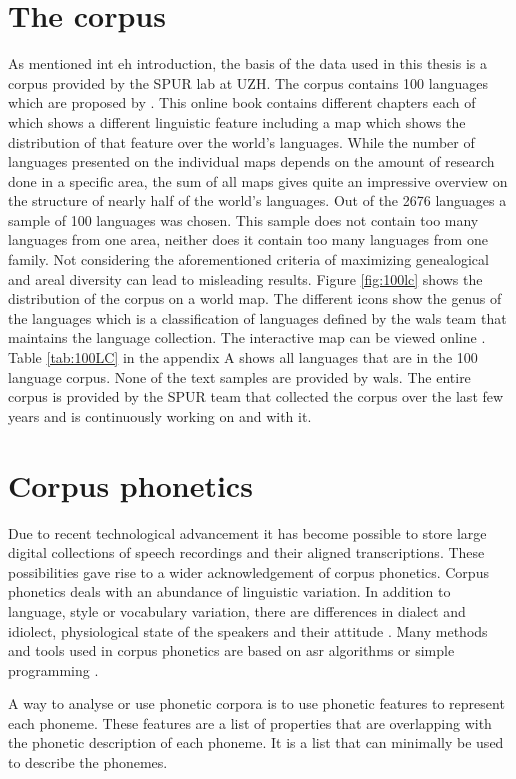 \section{The corpus}
\label{corpus}
As mentioned int eh introduction, the basis of the data used in this thesis is a corpus provided by the SPUR lab at UZH. The corpus contains 100 languages which are proposed by \citet{Comrie&Dryer.2013}. This online book contains different chapters each of which shows a different linguistic feature including a map which shows the distribution of that feature over the world's languages. While the number of languages presented on the individual maps depends on the amount of research done in a specific area, the sum of all maps gives quite an impressive overview on the structure of nearly half of the world's languages. Out of the 2676 languages a sample of 100 languages was chosen. This sample does not contain too many languages from one area, neither does it contain too many languages from one family. Not considering the aforementioned criteria of maximizing genealogical and areal diversity can lead to misleading results. Figure \ref{fig:100lc} shows the distribution of the corpus on a world map. The different icons show the genus of the languages which is a classification of languages defined by the \ac{wals} team that maintains the language collection. The interactive map can be viewed online \citep{100LC.21.07.2021}. Table \ref{tab:100LC} in the appendix A shows all languages that are in the 100 language corpus. None of the text samples are provided by \ac{wals}. The entire corpus is provided by the SPUR team that collected the corpus over the last few years and is continuously working on and with it.




\section{Corpus phonetics}
Due to recent technological advancement it has become possible to store large digital collections of speech recordings and their aligned transcriptions. These possibilities gave rise to a wider acknowledgement of corpus phonetics. Corpus phonetics deals with an abundance of linguistic variation. In addition to language, style or vocabulary variation, there are differences in dialect and idiolect, physiological state of the speakers and their attitude \citep{Liberman.2019, Chodroff.19.07.2019}. Many methods and tools used in corpus phonetics are based on \ac{asr} algorithms or simple programming \citep{Chodroff.19.07.2019}.

A way to analyse or use phonetic corpora is to use phonetic features to represent each phoneme. These features are a list of properties that are overlapping with the phonetic description of each phoneme. It is a list that can minimally be used to describe the phonemes. 

